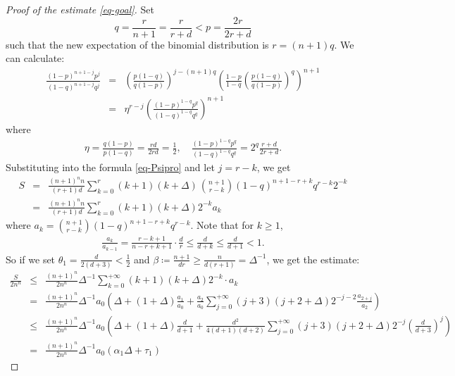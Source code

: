 \documentclass[12pt]{amsart}
\theoremstyle{definition}
\begin{document}
\begin{proof}[Proof of the estimate \eqref{eq-goal}]
Set 
$$q=\frac{r}{n+1}=\frac{r}{r+d}<p=\frac{2r}{2r+d}$$
such that the new expectation of the binomial distribution is $r=(n+1)q$. 
We can calculate: 
\begin{eqnarray*}
    \frac{(1-p)^{n+1-j}p^j}{(1-q)^{n+1-j}q^j}&=&\left(\frac{p(1-q)}{q(1-p)}\right)^{j-(n+1)q}\left(\frac{1-p}{1-q}\left(\frac{p(1-q)}{q(1-p)}\right)^q \right)^{n+1}\\
    &=&\eta^{r-j}\left(\frac{(1-p)^{1-q}p^q}{(1-q)^{1-q}q^q}\right)^{n+1}
\end{eqnarray*}
where 
\begin{eqnarray*}
    \eta=\frac{q(1-p)}{p(1-q)}=\frac{rd}{2r d}=\frac{1}{2}, \quad \frac{(1-p)^{1-q}p^q}{(1-q)^{1-q}q^q}
=2^q\frac{r+d}{2r+d}.
    \end{eqnarray*}
Substituting into the formula \eqref{eq-Psipro} and let $j=r-k$, 
we get
\begin{eqnarray}
    S &=& \frac{(n+1)^n n}{(r+1)d}\sum_{k=0}^{r}(k+1)(k+\Delta)\frac{}{}\binom{n+1}{r-k}(1-q)^{n+1-r+k} q^{r-k} 2^{-k}  \label{eq-Ssum}\\
    &=&\frac{(n+1)^n n}{(r+1)d}\sum_{k=0}^r (k+1)(k+\Delta)2^{-k} a_k 
\end{eqnarray}
where $a_k=\binom{n+1}{r-k}(1-q)^{n+1-r+k}q^{r-k}$. 
Note that for $k\geq 1$,
\begin{eqnarray*}
    \frac{a_{k}}{a_{k-1}}=\frac{r-k+1}{n-r+k+1}\cdot\frac{d}{r}\le \frac{d}{d+k}\le \frac{d}{d+1}<1.
\end{eqnarray*}
So if we set $\theta_1=\frac{d}{2(d+3)}<\frac{1}{2}$ and $\beta\coloneqq \frac{n+1}{dr}\geq \frac{n}{d(r+1)}=\Delta^{-1}$, we get the estimate:
\begin{eqnarray*}
    \frac{S}{2n^n} &\leq& \frac{(n+1)^n}{2n^n}\Delta^{-1}\sum_{k= 0}^{+\infty} (k+1)(k+\Delta)2^{-k} \cdot a_k\\
    &=&\frac{(n+1)^n}{2n^n}\Delta^{-1}a_0\left(\Delta+(1+\Delta)\frac{a_1}{a_0}+\frac{a_2}{a_0}\sum_{j=0}^{+\infty}(j+3)(j+2+\Delta)2^{-j-2}\frac{a_{2+j}}{a_2} \right)\\
    &\leq&\frac{(n+1)^n}{2n^n}\Delta^{-1}a_0 \left(\Delta+(1+\Delta)\frac{d}{d+1}+\frac{d^2}{4(d+1)(d+2)}\sum_{j=0}^{+\infty}(j+3)(j+2+\Delta)2^{-j}\left(\frac{d}{d+3}\right)^j \right)\\
    &=& \frac{(n+1)^n}{2n^n} \Delta^{-1}a_0 \left(\alpha_1\Delta+\tau_1\right)

\end{eqnarray*}
\end{proof}
\end{document}
